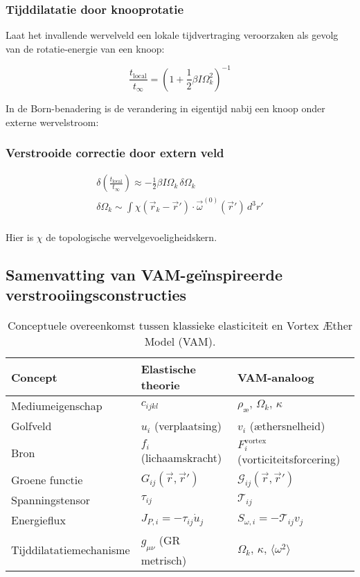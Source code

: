 \subsubsection*{Tijddilatatie door knooprotatie}

Laat het invallende wervelveld een lokale tijdvertraging veroorzaken als gevolg van de rotatie-energie van een knoop:

\[
\frac{t_\text{local}}{t_{\infty}} = \left(1 + \frac{1}{2} \beta I \Omega_k^2 \right)^{-1}
\]

In de Born-benadering is de verandering in eigentijd nabij een knoop onder externe wervelstroom:

\subsubsection*{Verstrooide correctie door extern veld}

\begin{gather*}
\delta \left( \frac{t_\text{local}}{t_{\infty}} \right) \approx - \frac{1}{2} \beta I \Omega_k \, \delta \Omega_k\\
\delta \Omega_k \sim \int \chi(\vec{r}_k - \vec{r}') \cdot \vec{\omega}^{(0)}(\vec{r}') \, d^3r'\\
\end{gather*}

Hier is \(\chi\) de topologische wervelgevoeligheidskern.

\subsection{Samenvatting van VAM-geïnspireerde verstrooiingsconstructies}

\begin{table}[htbp]
\centering
\begin{tabular}{lll}
\toprule
\textbf{Concept} & \textbf{Elastische theorie} & \textbf{VAM-analoog} \\
\midrule
Mediumeigenschap & \( c_{ijkl} \) & \( \rho_\text{\ae},\, \Omega_k,\, \kappa \) \\
Golfveld & \( u_i \) (verplaatsing) & \( v_i \) (æthersnelheid) \\
Bron & \( f_i \) (lichaamskracht) & \( F_i^\text{vortex} \) (vorticiteitsforcering) \\
Groene functie & \( G_{ij}(\vec{r}, \vec{r}') \) & \( \mathcal{G}_{ij}(\vec{r}, \vec{r}') \) \\
Spanningstensor & \( \tau_{ij} \) & \( \mathcal{T}_{ij} \) \\
Energieflux & \( J_{P,i} = -\tau_{ij} \dot{u}_j \) & \( S_{\omega,i} = -\mathcal{T}_{ij} v_j \) \\
Tijddilatatiemechanisme & \( g_{\mu\nu} \) (GR metrisch) & \( \Omega_k,\, \kappa,\, \langle \omega^2 \rangle \) \\
\bottomrule
\end{tabular}
\caption{Conceptuele overeenkomst tussen klassieke elasticiteit en Vortex Æther Model (VAM).}
\label{tab:elastic-vam-analogy}
\end{table}


